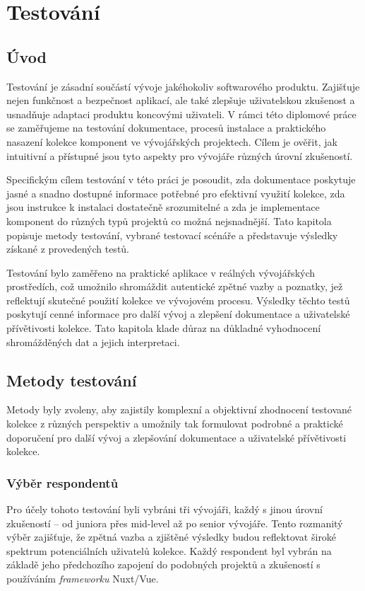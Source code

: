 
\chapter{Testování}

\section{Úvod}
Testování je zásadní součástí vývoje jakéhokoliv softwarového produktu. Zajišťuje nejen funkčnost a bezpečnost aplikací, ale také zlepšuje uživatelskou zkušenost a usnadňuje adaptaci produktu koncovými uživateli. V rámci této diplomové práce se zaměřujeme na testování dokumentace, procesů instalace a praktického nasazení kolekce komponent ve vývojářských projektech. Cílem je ověřit, jak intuitivní a přístupné jsou tyto aspekty pro vývojáře různých úrovní zkušeností.

Specifickým cílem testování v této práci je posoudit, zda dokumentace poskytuje jasné a snadno dostupné informace potřebné pro efektivní využití kolekce, zda jsou instrukce k instalaci dostatečně srozumitelné a zda je implementace komponent do různých typů projektů co možná nejsnadnější. Tato kapitola popisuje metody testování, vybrané testovací scénáře a představuje výsledky získané z provedených testů.

Testování bylo zaměřeno na praktické aplikace v reálných vývojářských prostředích, což umožnilo shromáždit autentické zpětné vazby a poznatky, jež reflektují skutečné použití kolekce ve vývojovém procesu. Výsledky těchto testů poskytují cenné informace pro další vývoj a zlepšení dokumentace a uživatelské přívětivosti kolekce. Tato kapitola klade důraz na důkladné vyhodnocení shromážděných dat a jejich interpretaci.

\section{Metody testování}
Metody byly zvoleny, aby zajistily komplexní a objektivní zhodnocení testované kolekce z různých perspektiv a umožnily tak formulovat podrobné a praktické doporučení pro další vývoj a zlepšování dokumentace a uživatelské přívětivosti kolekce.

\subsection{Výběr respondentů}
Pro účely tohoto testování byli vybráni tři vývojáři, každý s jinou úrovní zkušeností – od juniora přes mid-level až po senior vývojáře. Tento rozmanitý výběr zajišťuje, že zpětná vazba a zjištěné výsledky budou reflektovat široké spektrum potenciálních uživatelů kolekce. Každý respondent byl vybrán na základě jeho předchozího zapojení do podobných projektů a zkušeností s používáním \emph{frameworku} Nuxt/Vue.

